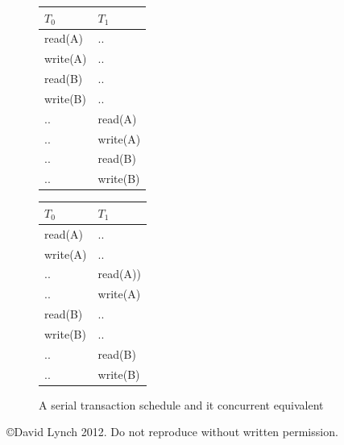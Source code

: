 \documentclass[10pt,a4paper]{article}
\begin{document}
\begin{figure}
\caption{A serial transaction schedule and it concurrent equivalent}
\begin{center}
\begin{tabular}{| l | l | }
  \hline
  $T_0$ & $T_1$ \\ \hline
  read(A) & .. \\
  write(A) & .. \\
  read(B) & .. \\
  write(B)	& .. \\
  .. & read(A) \\
  .. & write(A) \\
  .. & read(B) \\
  .. & write(B) \\
  \hline
\end{tabular}
\begin{tabular}{| l | l | }
  \hline
  $T_0$ & $T_1$ \\ \hline
  read(A) & .. \\
  write(A) & .. \\
  .. & read(A)) \\
  .. & write(A) \\
  read(B) & .. \\
  write(B) & .. \\
  .. & read(B) \\
  .. & write(B) \\
  \hline
\end{tabular}
\label{sershedule}
\end{center}
\end{figure}
{}

\begin{center}
{\small \copyright  David Lynch 2012. Do not reproduce without written permission.}
\end{center}
\end{document}
